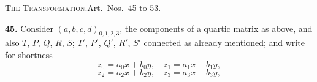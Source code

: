 \documentclass[11pt]{article}
\begin{document}
\medskip
\begin{center}\textsc{The Transformation.}\quad Art.\ Nos.~45 to 53.\end{center}

\noindent\textbf{45.} Consider $(a,b,c,d)_{0,1,2,3}$, the components of a quartic matrix as above, and also $T$, $P$, $Q$, $R$, $S$; $T'$, $P'$, $Q'$, $R'$, $S'$ connected as already mentioned; and write for shortness
\[
z_{0}=a_{0}x+b_{0}y,\quad z_{1}=a_{1}x+b_{1}y,
\]
\[
z_{2}=a_{2}x+b_{2}y,\quad z_{3}=a_{3}x+b_{3}y,
\]
\end{document}

